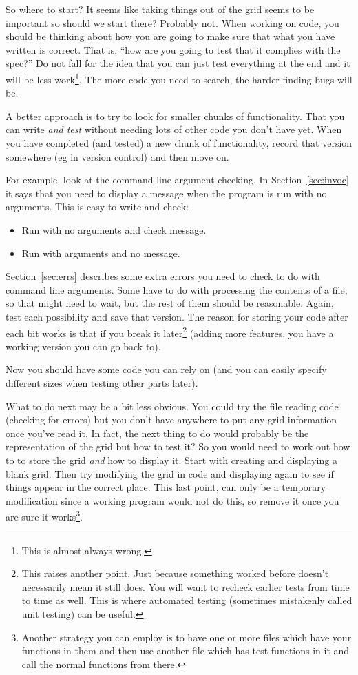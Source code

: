 So where to start?
It seems like taking things out of the grid seems to be important so should we start there?
Probably not.
When working on code, you should be thinking about how you are going to make sure that what you have written is correct.
That is, ``how are you going to test that it complies with the spec?''
Do not fall for the idea that you can just test everything at the end and it will be less work\footnote{This is almost always wrong.}.
The more code you need to search, the harder finding bugs will be.

A better approach is to try to look for smaller chunks of functionality.
That you can write \emph{and test} without needing lots of other code you don't have yet.
When you have completed (and tested) a new chunk of functionality, record that version somewhere (eg in version control)
and then move on.

For example, look at the command line argument checking.
In Section~\ref{sec:invoc} it says that you need to display a message when the program is run with no arguments.
This is easy to write and check:
\begin{itemize}
 \item Run with no arguments and check message.
 \item Run with arguments and no message.
\end{itemize}

Section~\ref{sec:errs} describes some extra errors you need to check to do with command line arguments.
Some have to do with processing the contents of a file, so that might need to wait, but the rest of them
should be reasonable.
Again, test each possibility and save that version.
The reason for storing your code after each bit works is that if you break it later\footnote{This raises
another point. Just because something worked before doesn't necessarily mean it still does.
You will want to recheck earlier tests from time to time as well. This is where
automated testing (sometimes mistakenly called unit testing) can be useful.} (adding more features, you have a 
working version you can go back to).

Now you should have some code you can rely on (and you can easily specify different sizes when testing other parts later).

What to do next may be a bit less obvious.
You could try the file reading code (checking for errors) but you don't have anywhere to put any grid information once you've
read it.
In fact, the next thing to do would probably be the representation of the grid but how to test it?
So you would need to work out how to to store the grid \emph{and} how to display it.
Start with creating and displaying a blank grid.
Then try modifying the grid in code and displaying again to see if things appear in the correct place.
This last point, can only be a temporary modification since a working program would not do this, so remove it once you 
are sure it works\footnote{Another strategy you can employ is to have one or more files which have your functions in them and then
use another file which has test functions in it and call the normal functions from there.}.

